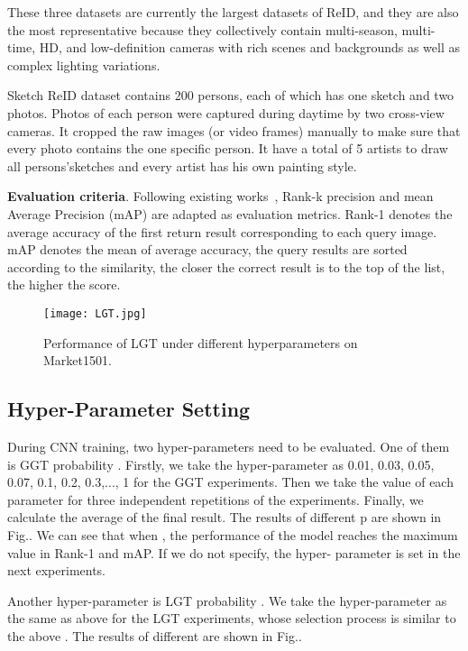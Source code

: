 \documentclass[10pt,twocolumn,letterpaper]{article}
\begin{document}
These three datasets are currently the largest datasets of ReID, and they are also the most representative because they collectively contain multi-season, multi-time, HD, and low-definition cameras with rich scenes and backgrounds as well as complex lighting variations.

Sketch ReID dataset\cite{sketch-criminal} contains 200 persons, each of which has one sketch and two photos. Photos of each person were captured during daytime by two cross-view cameras. It cropped the raw images (or video frames) manually to make sure that every photo contains the one specific person. It have a total of 5 artists to draw all persons’sketches and every artist has his own painting style.

\textbf{Evaluation criteria}. Following existing works~\cite{market1501}, Rank-k precision and mean Average Precision (mAP) are adapted as evaluation metrics. Rank-1 denotes the average accuracy of the first return result corresponding to each query image. mAP denotes the mean of average accuracy, the query results are sorted according to the similarity, the closer the correct result is to the top of the list, the higher the score.

\begin{figure}[t]
	\setlength{\abovecaptionskip}{0.1cm}
	\setlength{\belowcaptionskip}{-0.4cm}   \centering
	\texttt{[image: LGT.jpg]}
	\caption{Performance of LGT under different hyperparameters on Market1501.}
\end{figure}
\subsection{Hyper-Parameter Setting}
During CNN training, two hyper-parameters need to be evaluated. One of them is GGT probability . Firstly, we take the hyper-parameter  as 0.01, 0.03, 0.05, 0.07, 0.1, 0.2, 0.3,..., 1 for the GGT experiments. Then we take the value of each parameter for three independent repetitions of the experiments. Finally, we calculate the average of the final result. The results of different p are shown in Fig.. We can see that when , the performance of the model reaches the maximum value in Rank-1 and mAP. If we do not specify, the hyper- parameter is set  in the next experiments.


Another hyper-parameter is LGT probability . We take the hyper-parameter  as the same as above for the LGT experiments, whose selection process is similar to the above . The results of different  are shown in Fig..
\end{document}
